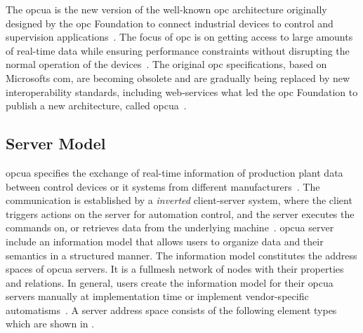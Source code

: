 \documentclass[
a4paper,
twoside,
headsepline,
cleardoublepage=empty,
parskip=half,
draft=false
]{scrbook}
\begin{document}
			The \gls{opcua} is the new version of the well-known \gls{opc} architecture originally designed by the \gls{opc} Foundation to
			connect industrial devices to control and supervision applications~\cite{hadlich2006providing}. The focus of \gls{opc} is on getting access to large amounts of real-time data while ensuring performance constraints without disrupting the normal operation of the devices~\cite{candido2010soa}.
			The original \gls{opc} specifications, based on Microsofts \gls{com}, are becoming obsolete and are gradually being replaced by new interoperability standards, including web-services what led the \gls{opc} Foundation to publish a new architecture, called \gls{opcua}~\cite{hadlich2006providing}.

			\subsection{Server Model}\label{subsec:opc_ua_server_model}

				\gls{opcua} specifies the exchange of real-time information of production plant data between control devices or \gls{it} systems from different manufacturers~\cite{venkatesh2005validating}.
				The communication is established by a \textit{inverted} client-server system, where the client triggers actions on the server for automation control, and the server executes the commands on, or retrieves data from the underlying machine~\cite{imtiaz2013scalability}.
				\gls{opcua} server include an information model that allows users to organize data and their semantics in a structured manner.
				The information model constitutes the address spaces of \gls{opcua} servers.
				It is a fullmesh network of nodes with their properties and relations.
				In general, users create the information model for their \gls{opcua} servers manually at implementation time or implement vendor-specific automatisms~\cite{henssen2014online}.
				A server address space consists of the following element types which are shown in .
\end{document}
